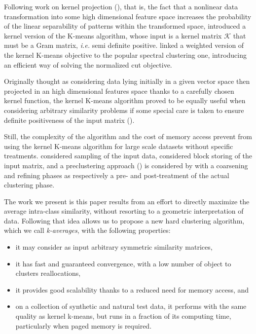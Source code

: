 \documentclass[a4paper,twoside]{article}
\begin{document}
Following work on kernel projection (\cite{Vapnik:1995:NSL:211359}), that is, the fact that a nonlinear data transformation into some high dimensional feature space increases the probability of the linear separability of patterns within the transformed space, \cite{Girolami:2002:MKC:2325785.2326903} introduced a kernel version of the K-means algorithm, whose input is a kernel matrix $\mathcal{K}$ that must be a Gram matrix, \textit{i.e.} semi definite positive. \cite{Dhillon:2007:WGC:1313055.1313291} linked a weighted version of the kernel K-means objective to the popular spectral clustering one, introducing an efficient way of solving the normalized cut objective.

Originally thought as considering data lying initially in a given vector space then projected in an high dimensional features space thanks to a carefully chosen kernel function, the kernel K-means algorithm proved to be equally useful when considering arbitrary similarity problems if some special care is taken to ensure definite positiveness of the input matrix (\cite{Roth:2003:OCP:960254.960291}).

Still, the complexity of the algorithm and the cost of memory  access  prevent from using the kernel K-means algorithm for large scale datasets without specific treatments. \cite{Chitta:2011:AKK:2020408.2020558} considered sampling of the input data, \cite{1047453} considered block storing of the input matrix, and a preclustering  approach (\cite{bradley98scaling, conf/icde/GantiRGPF99}) is considered by \cite{Kulis2008} with a coarsening and refining phases as respectively a pre- and post-treatment of the actual clustering phase.

The work we present is this paper results from an effort to directly maximize the average intra-class similarity, without resorting to a geometric interpretation of data. Following that idea allows us to propose a new hard clustering algorithm, which we call \emph{k-averages}, with the following properties: 
\begin{itemize}
\item it may consider as input arbitrary symmetric similarity matrices,
\item it has fast and guaranteed convergence, with a low number of object to clusters reallocations,
\item it provides good scalability thanks to a reduced need for memory access, and
\item on a collection of synthetic and natural test data, it performs with the same quality as kernel k-means, but runs in a fraction of its computing time, particularly when paged memory is required.
\end{itemize}
\end{document}
